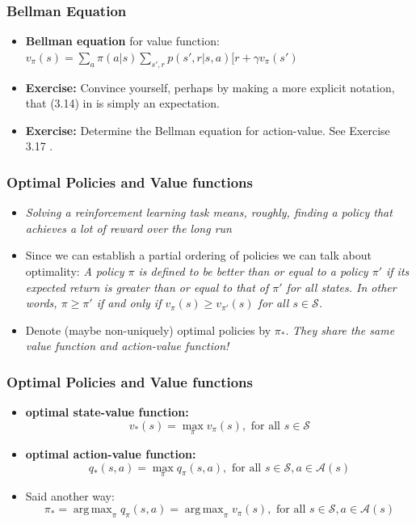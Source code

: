 \documentclass{beamer}
\DeclareMathOperator*{\argmax}{arg\,max}
\begin{document}
\begin{frame}
  \frametitle{Bellman Equation}
  \begin{itemize}
  \item {\bf Bellman equation} for value function: $v_\pi(s) = \sum_a \pi(a|s)
\sum_{s', r} p(s',r|s,a) [r + \gamma v_{\pi} (s')$
  \item {\bf Exercise:} Convince yourself, perhaps by making a more explicit
    notation, that (3.14) in \cite{Sutton2018} is simply an expectation.

  \item {\bf Exercise:} Determine the Bellman equation for action-value. See Exercise
    3.17 \cite{Sutton2018}.
  \end{itemize}
\end{frame}

\begin{frame}
  \frametitle{Optimal Policies and Value functions \cite{Sutton2018}}
  \begin{itemize}
  \item {\em Solving a reinforcement learning task means, roughly, finding a
      policy that achieves a lot of reward over the long run}
  \item Since we can establish a partial ordering of policies we can talk about
    optimality: {\em A policy $\pi$ is defined to be better than or equal to a
      policy $\pi'$ if its expected return is greater than or equal to that of $\pi'$
      for all states. In other words, $\pi \geq \pi'$ if and only if $v_\pi(s) \geq
      v_{\pi'} (s)$ for all $s \in \mathcal{S}$.}
  \item Denote (maybe non-uniquely) optimal policies by $\pi_*$. {\em They share the same
    value function and action-value function!}
  \end{itemize}
\end{frame}

\begin{frame}
  \frametitle{Optimal Policies and Value functions \cite{Sutton2018}}
  \begin{itemize}
  \item {\bf optimal state-value function:}
    \[ v_*(s) = \max_{\pi}v_{\pi}(s), \text{ for all } s \in \mathcal{S} \]
  \item {\bf optimal action-value function:}
    \[ q_*(s,a) = \max_{\pi} q_{\pi}(s,a), \text{ for all } s \in \mathcal{S}, a \in \mathcal{A}(s) \]
  \item Said another way:
    \[\pi_* = \argmax_{\pi} q_{\pi}(s,a) = \argmax_{\pi} v_{\pi}(s) , \text{ for all } s \in \mathcal{S}, a \in \mathcal{A}(s) \]
  \end{itemize}
\end{frame}
\end{document}
